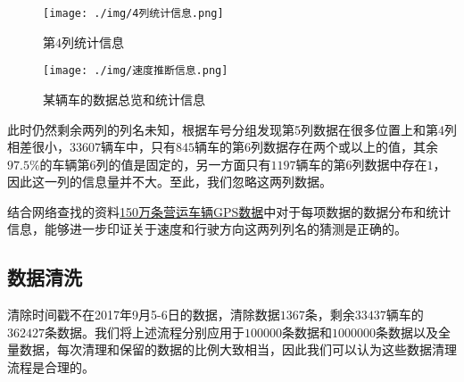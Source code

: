 \documentclass[UTF8]{ctexart}
\begin{document}
\begin{figure}[!htb]
    \centering
    \texttt{[image: ./img/4列统计信息.png]}
    \caption{第4列统计信息}
    \label{4-stat}
\end{figure}

\begin{figure}[!htb]
    \centering
    \texttt{[image: ./img/速度推断信息.png]}
    \caption{某辆车的数据总览和统计信息}
    \label{v}
\end{figure}

此时仍然剩余两列的列名未知，根据车号分组发现第5列数据在很多位置上和第4列相差很小，$33607$辆车中，只有$845$辆车的第6列数据存在两个或以上的值，其余$97.5\%$的车辆第6列的值是固定的，另一方面只有$1197$辆车的第6列数据中存在$1$，因此这一列的信息量并不大。至此，我们忽略这两列数据。

结合网络查找的资料\href{https://www.heywhale.com/mw/dataset/5f75ad252b83e00030b3f91d/file}{150万条营运车辆GPS数据}中对于每项数据的数据分布和统计信息，能够进一步印证关于速度和行驶方向这两列列名的猜测是正确的。

\subsection{数据清洗}

清除时间戳不在2017年9月5-6日的数据，清除数据$1367$条，剩余$33437$辆车的$362427$条数据。我们将上述流程分别应用于$100000$条数据和$1000000$条数据以及全量数据，每次清理和保留的数据的比例大致相当，因此我们可以认为这些数据清理流程是合理的。
\end{document}

